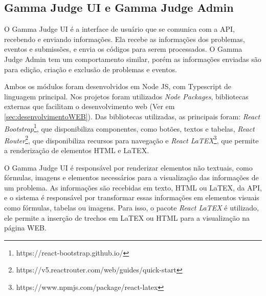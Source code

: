 \subsection{Gamma Judge UI e Gamma Judge Admin} 
\label{subsec:arquitetura_judge_ui}

O Gamma Judge UI é a interface de usuário que se comunica com a API, recebendo e enviando informações. Ela recebe as informações dos problemas, eventos e submissões, e envia os códigos para serem processados. O Gamma Judge Admin tem um comportamento similar, porém as informações enviadas são para edição, criação e exclusão de problemas e eventos. 

Ambos os módulos foram desenvolvidos em Node JS, com Typescript de linguagem principal. Nos projetos foram utilizados \textit{Node Packages}, bibliotecas externas que facilitam o desenvolvimento web (Ver em \ref{sec:desenvolvimentoWEB}). Das bibliotecas utilizadas, as principais foram: \textit{React Bootstrap}\footnote{https://react-bootstrap.github.io/}, que disponibiliza componentes, como botões, textos e tabelas, \textit{React Router}\footnote{https://v5.reactrouter.com/web/guides/quick-start}, que disponibiliza recursos para navegação e \textit{React LaTEX}\footnote{https://www.npmjs.com/package/react-latex}, que permite a renderização de elementos HTML e LaTEX.

O Gamma Judge UI é responsável por renderizar elementos não textuais, como fórmulas, imagens e elementos necessários para a visualização das informações de um problema. As informações são recebidas em texto, HTML ou LaTEX, da API, e o sistema é responsável por transformar essas informações em elementos visuais como fórmulas, tabelas ou imagens. Para isso, o pacote \textit{React LaTEX} é utilizado, ele permite a inserção de trechos em LaTEX ou HTML para a visualização na página WEB.





